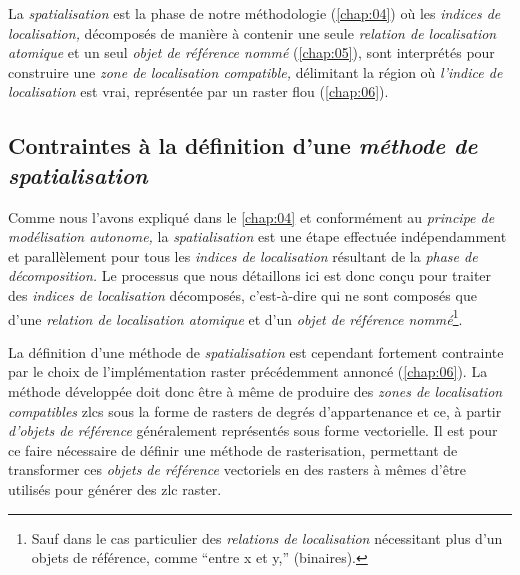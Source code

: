 La \emph{spatialisation} est la phase de notre méthodologie
(\autoref{chap:04}) où les \emph{indices de localisation,} décomposés
de manière à contenir une seule \emph{relation de localisation
  atomique} et un seul \emph{objet de référence nommé}
(\autoref{chap:05}), sont interprétés pour construire une \emph{zone
  de localisation compatible,} délimitant la région où \emph{l'indice
  de localisation} est vrai, représentée par un raster flou
(\autoref{chap:06}).

\subsection{Contraintes à la définition d'une \emph{méthode de spatialisation}}

Comme nous l'avons expliqué dans le \autoref{chap:04} et conformément
au \emph{principe de modélisation autonome,} la \emph{spatialisation}
est une étape effectuée indépendamment et parallèlement pour tous les
\emph{indices de localisation} résultant de la \emph{phase de
  décomposition.} Le processus que nous détaillons ici est donc conçu
pour traiter des \emph{indices de localisation} décomposés,
c'est-à-dire qui ne sont composés que d'une \emph{relation de
  localisation atomique} et d'un \emph{objet de référence
  nommé}\footnote{Sauf dans le cas particulier des \emph{relations de
    localisation} nécessitant plus d'un objets de référence, comme
  \enquote{entre x et y,} (\ie binaires).}.

La définition d'une méthode de \emph{spatialisation} est cependant
fortement contrainte par le choix de l'implémentation raster
précédemment annoncé (\autoref{chap:06}). La méthode développée doit
donc être à même de produire des \emph{zones de localisation
  compatibles} \acp{zlc} sous la forme de rasters de degrés
d'appartenance et ce, à partir \emph{d'objets de référence}
généralement représentés sous forme vectorielle. Il est pour ce faire
nécessaire de définir une méthode de rasterisation, permettant de
transformer ces \emph{objets de référence} vectoriels en des rasters à
mêmes d'être utilisés pour générer des \ac{zlc} raster.

